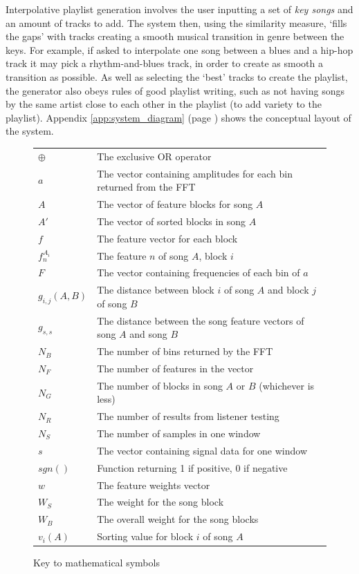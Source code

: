Interpolative playlist generation involves the user inputting a set of \emph{key songs} and an amount of tracks to add. The system then, using the similarity measure, `fills the gaps' with tracks creating a smooth musical transition in genre between the keys. For example, if asked to interpolate one song between a blues and a hip-hop track it may pick a rhythm-and-blues track, in order to create as smooth a transition as possible. As well as selecting the `best' tracks to create the playlist, the generator also obeys rules of good playlist writing, such as not having songs by the same artist close to each other in the playlist (to add variety to the playlist). Appendix \ref{app:system_diagram} (page \pageref{app:system_diagram}) shows the conceptual layout of the system.
\begin{figure}[ht]
	\caption{Key to mathematical symbols}
	\begin{tabular}{l l}
		$\oplus$		& The exclusive OR operator \\
		$a$				& The vector containing amplitudes for each bin returned from the FFT \\
		$A$				& The vector of feature blocks for song $A$ \\
		$A'$			& The vector of sorted blocks in song $A$ \\
		$f$				& The feature vector for each block \\
		$f_n^{A_{i}}$	& The feature $n$ of song $A$, block $i$ \\
		$F$				& The vector containing frequencies of each bin of $a$ \\
		$g_{i,j}(A,B)$	& The distance between block $i$ of song $A$ and block $j$ of song $B$ \\
		$g_{s,s}$		& The distance between the song feature vectors of song $A$ and song $B$ \\
		$N_B$			& The number of bins returned by the FFT \\
		$N_F$			& The number of features in the vector \\
		$N_G$			& The number of blocks in song $A$ or $B$ (whichever is less) \\
		$N_R$			& The number of results from listener testing \\
		$N_S$			& The number of samples in one window \\
		$s$				& The vector containing signal data for one window \\
		$sgn()$			& Function returning 1 if positive, 0 if negative \\
		$w$				& The feature weights vector \\
		$W_S$			& The weight for the song block \\
		$W_B$			& The overall weight for the song blocks \\
		$v_i(A)$		& Sorting value for block $i$ of song $A$ \\
	\end{tabular}
\end{figure}

